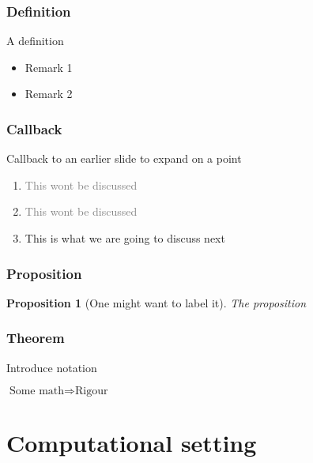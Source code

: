 \documentclass{beamer}
\newtheorem{proposition}[theorem]{Proposition}
\begin{document}
\begin{frame}
    \frametitle{Definition}
    
    \begin{definition}
        A definition
    \end{definition}

    \begin{itemize}
        \item Remark 1
        \item Remark 2
    \end{itemize}

\end{frame}

\begin{frame}
    \frametitle{Callback}
    
    	Callback to an earlier slide to expand on a point 
    
        \begin{enumerate}
            \item \textcolor{gray}{This wont be discussed}
            \item \textcolor{gray}{This wont be discussed}
            \item This is what we are going to discuss next  
        \end{enumerate}
    
\end{frame}

\begin{frame}
    \frametitle{Proposition}

    \begin{proposition}[One might want to label it]
        The proposition
    \end{proposition}

\end{frame}

\begin{frame}
\frametitle{Theorem}

Introduce notation

    \begin{theorem}
        $\mbox{Some math}\Rightarrow \mbox{Rigour}$
    \end{theorem}

\end{frame}

\section{Computational setting}
\end{document}
